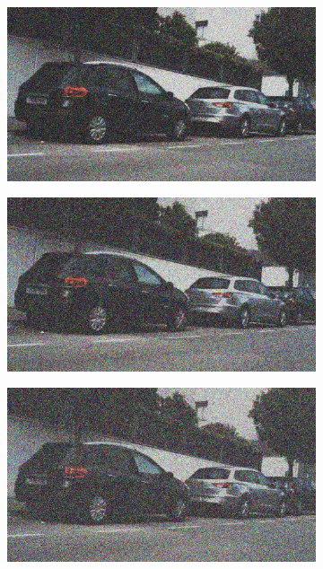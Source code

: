 \documentclass[a4paper]{ctexart}
\begin{document}
\begin{figure}[htbp]
\begin{subfigure}{0.08\textwidth}
				\label{fig：Gamma=0.3, Gauss Noise = 0.4}
			\end{subfigure}
			\begin{subfigure}{0.08\textwidth}
				\captionsetup{font=scriptsize}
				\includegraphics[width=\linewidth]{picture/Edge Detection/degrade/RGB_001 Gamma=0.3, Gauss Noise=0.5}
				\label{fig：Gamma=0.3, Gauss Noise = 0.5}
			\end{subfigure}
			\begin{subfigure}{0.08\textwidth}
				\captionsetup{font=scriptsize}
				\includegraphics[width=\linewidth]{picture/Edge Detection/degrade/RGB_001 Gamma=0.3, Gauss Noise=0.6}
				\label{fig：Gamma=0.3, Gauss Noise = 0.6}
			\end{subfigure}
			\begin{subfigure}{0.08\textwidth}
				\captionsetup{font=scriptsize}
				\includegraphics[width=\linewidth]{picture/Edge Detection/degrade/RGB_001 Gamma=0.3, Gauss Noise=0.7}

\end{subfigure}
\end{figure}
\end{document}
